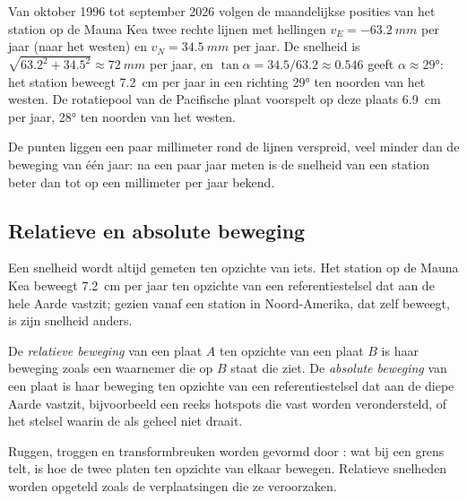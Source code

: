 \begin{example}\label{ex:g11:plate-motions:mkea}
Van oktober 1996 tot september 2026 volgen de maandelijkse posities van het
station op de Mauna Kea twee rechte lijnen met hellingen $v_E =
\qty{-63.2}{mm}$ per jaar (naar het westen) en $v_N = \qty{+34.5}{mm}$ per jaar. De
snelheid is $\sqrt{63.2^2 + 34.5^2} \approx \qty{72}{mm}$ per jaar, en $\tan\alpha
= 34.5/63.2 \approx 0.546$ geeft $\alpha \approx \ang{29}$: het station beweegt
\qty{7.2}{cm} per jaar in een richting \ang{29} ten noorden van het westen. De
rotatiepool van de Pacifische plaat voorspelt op deze plaats \qty{6.9}{cm} per jaar,
\ang{28} ten noorden van het westen.
\end{example}

De punten liggen een paar millimeter rond de lijnen verspreid, veel minder dan de
beweging van één jaar: na een paar jaar meten is de snelheid van een station
beter dan tot op een millimeter per jaar bekend.

\subsection{Relatieve en absolute beweging}

Een snelheid wordt altijd gemeten ten opzichte van iets. Het station op de Mauna
Kea beweegt \qty{7.2}{cm} per jaar ten opzichte van een referentiestelsel dat aan
de hele Aarde vastzit; gezien vanaf een station in Noord-Amerika, dat zelf beweegt,
is zijn snelheid anders.

\begin{definition}\label{def:g11:plate-motions:relative-motion}
De \emph{relatieve beweging} van een plaat $A$ ten
opzichte van een plaat $B$ is haar beweging zoals een waarnemer die op $B$ staat
die ziet. De \emph{absolute beweging} van een plaat is
haar beweging ten opzichte van een referentiestelsel dat aan de diepe Aarde
vastzit, bijvoorbeeld een reeks hotspots die vast worden verondersteld, of het
stelsel waarin de  als geheel niet draait.
\end{definition}

Ruggen, troggen en transformbreuken worden gevormd door : wat
bij een grens telt, is hoe de twee platen ten opzichte van elkaar bewegen.
Relatieve snelheden worden opgeteld zoals de verplaatsingen die ze veroorzaken.

